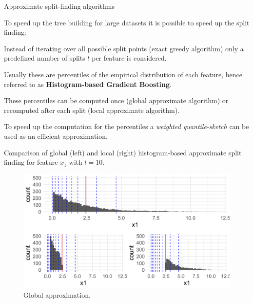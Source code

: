\begin{vbframe}{Approximate split-finding algorithms}

To speed up the tree building for large datasets it is possible to speed up the split finding:

\lz

Instead of iterating over all possible split points (exact greedy algorithm) only a predefined number of splits $l$ per feature is considered.

\lz

Usually these are percentiles of the empirical distribution of each feature, hence referred to as \textbf{Histogram-based Gradient Boosting}.

\lz

These percentiles can be computed once (global approximate algorithm) or recomputed after each split (local approximate algorithm).

\lz

To speed up the computation for the percentiles a \emph{weighted quantile-sketch} can be used as an efficient approximation.


\framebreak

Comparison of global (left) and local (right) histogram-based approximate split finding for feature $x_1$ with $l=10$.

\lz

\begin{small}
\begin{minipage}[b]{0.49\textwidth}
\begin{figure}
  \includegraphics[width=\textwidth]{figure_man/split-finding01.png}
  \caption*{Global approximation.}
\end{figure}


\end{minipage}
\end{small}
\end{vbframe}
